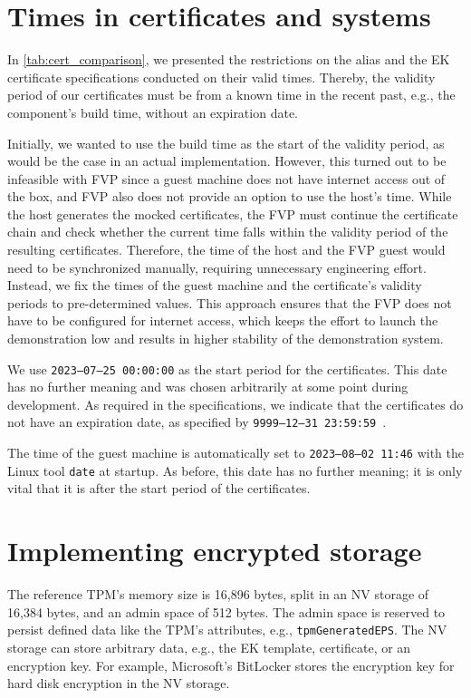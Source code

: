 \section{Times in certificates and systems}

In \autoref{tab:cert_comparison}, we presented the restrictions on the alias and the EK certificate specifications conducted on their valid times.
Thereby, the validity period of our certificates must be from a known time in the recent past, e.g., the component's build time, without an expiration date.

Initially, we wanted to use the build time as the start of the validity period, as would be the case in an actual implementation.
However, this turned out to be infeasible with FVP since a guest machine does not have internet access out of the box, and FVP also does not provide an option to use the host's time.
While the host generates the mocked certificates, the FVP must continue the certificate chain and check whether the current time falls within the validity period of the resulting certificates.
Therefore, the time of the host and the FVP guest would need to be synchronized manually, requiring unnecessary engineering effort.
Instead, we fix the times of the guest machine and the certificate's validity periods to pre-determined values.
This approach ensures that the FVP does not have to be configured for internet access, which keeps the effort to launch the demonstration low and results in higher stability of the demonstration system.

We use \texttt{2023--07--25 00:00:00} as the start period for the certificates.
This date has no further meaning and was chosen arbitrarily at some point during development.
As required in the specifications, we indicate that the certificates do not have an expiration date, as specified by \texttt{9999--12--31 23:59:59}~\cite{Boeyen2008}.

The time of the guest machine is automatically set to \texttt{2023--08--02 11:46} with the Linux tool \texttt{date} at startup.
As before, this date has no further meaning; it is only vital that it is after the start period of the certificates.

\section{Implementing encrypted storage}

The reference TPM's memory size is 16,896 bytes, split in an NV storage of 16,384 bytes, and an admin space of 512 bytes.
The admin space is reserved to persist defined data like the TPM's attributes, e.g., \texttt{tpmGeneratedEPS}.
The NV storage can store arbitrary data, e.g., the EK template, certificate, or an encryption key.
For example, Microsoft's BitLocker stores the encryption key for hard disk encryption in the NV storage.

